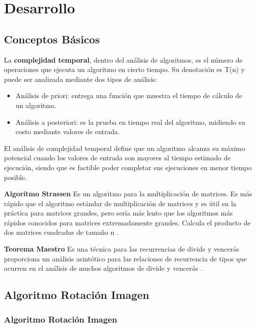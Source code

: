 \chapter{Desarrollo}

\section{Conceptos Básicos}
    La \textbf{complejidad temporal}, dentro del análisis de algoritmos, es el número de operaciones que ejecuta un algoritmo en cierto tiempo. Su denotación es T(n) y puede ser analizada mediante dos tipos de análisis:
    
    \begin{itemize}
        \item Análisis de priori: entrega una función que muestra el tiempo de cálculo de un algoritmo.
        \item Análisis a posteriori: es la prueba en tiempo real del algoritmo, midiendo su costo mediante valores de entrada. 
    \end{itemize}
    
    El análisis de complejidad temporal define que un algoritmo alcanza su máximo potencial cuando los valores de entrada son mayores al tiempo estimado de ejecución, siendo que es factible poder completar sus ejecuciones en menor tiempo posible. 
    
    \textbf{Algoritmo Strassen} Es un algoritmo para la multiplicación de matrices. Es más rápido que el algoritmo estándar de multiplicación de matrices y es útil en la práctica para matrices grandes, pero sería más lento que los algoritmos más rápidos conocidos para matrices extremadamente grandes. Calcula el producto de dos matrices cuadradas de tamaño n \cite{Strassen}.

    \textbf{Teorema Maestro} Es una técnica para las recurrencias de divide y vencerás proporciona un análisis asintótico para las relaciones de recurrencia de tipos que ocurren en el análisis de muchos algoritmos de divide y vencerás \cite{TM}.
    
    
    
    
\newpage
\section{Algoritmo Rotación Imagen}
    \subsection{Algoritmo Rotación Imagen}
   
